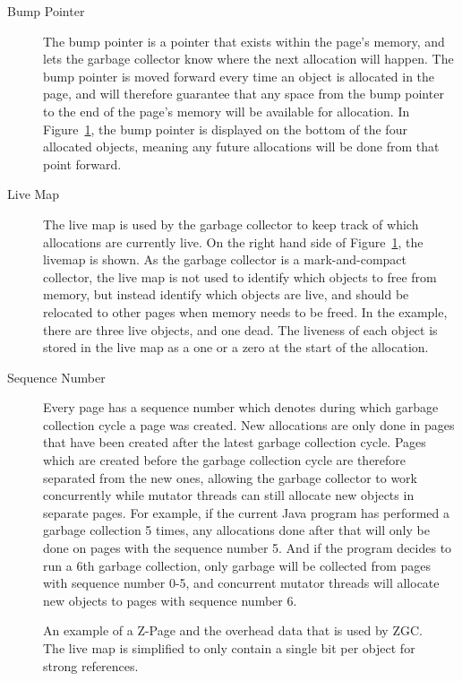 \begin{description}
    \item[Bump Pointer]
        The bump pointer is a pointer that exists within the page's memory, and lets the garbage collector know where the next allocation will happen. The bump pointer is moved forward every time an object is allocated in the page, and will therefore guarantee that any space from the bump pointer to the end of the page's memory will be available for allocation. In Figure~\ref*{fig:zpages}, the bump pointer is displayed on the bottom of the four allocated objects, meaning any future allocations will be done from that point forward.
    \item[Live Map]
        The live map is used by the garbage collector to keep track of which allocations are currently live. On the right hand side of Figure~\ref*{fig:zpages}, the livemap is shown. As the garbage collector is a mark-and-compact collector, the live map is not used to identify which objects to free from memory, but instead identify which objects are live, and should be relocated to other pages when memory needs to be freed. In the example, there are three live objects, and one dead. The liveness of each object is stored in the live map as a one or a zero at the start of the allocation.
    \item[Sequence Number]
        Every page has a sequence number which denotes during which garbage collection cycle a page was created. New allocations are only done in pages that have been created after the latest garbage collection cycle. Pages which are created before the garbage collection cycle are therefore separated from the new ones, allowing the garbage collector to work concurrently while mutator threads can still allocate new objects in separate pages. For example, if the current Java program has performed a garbage collection 5 times, any allocations done after that will only be done on pages with the sequence number 5. And if the program decides to run a 6th garbage collection, only garbage will be collected from pages with sequence number 0-5, and concurrent mutator threads will allocate new objects to pages with sequence number 6.
\end{description}

\begin{figure}[H]
    \centering
    
    \caption[]
    {An example of a Z-Page and the overhead data that is used by ZGC. The live map is simplified to only contain a single bit per object for strong references.} 
    \label{fig:zpages}
\end{figure}

